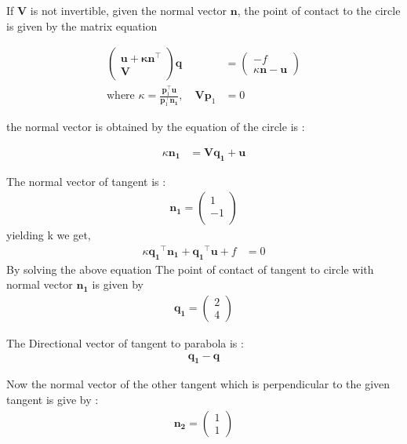 \documentclass[journal,10pt,twocolumn]{article}
\let\vec\mathbf
\newcommand{\myvec}[1]{\ensuremath{\begin{pmatrix}#1\end{pmatrix}}}
\begin{document}
If $\vec{V}$ is not invertible,  given the normal vector $\vec{n}$, the point of contact to the circle is given by the matrix equation

\begin{align}
\label{eq:conic_tangent_q_eigen}
\begin{pmatrix}
\vec{u+\kappa \vec{n}}^{\top} \\ \vec{V}
\end{pmatrix}
\vec{q} &= 
\begin{pmatrix}
-f
\\
\kappa\vec{n}-\vec{u}
\end{pmatrix}
\\
\text{where }  \kappa = \frac{\vec{p}_1^{\top}\vec{u}}{\vec{p}_1^{\top}\vec{n_1}}, \quad \vec{V}\vec{p}_1 &= 0
\label{eq:conic_tangent_qk_eigen}
\end{align}





the normal vector is obtained by the equation of the circle is :

\begin{align}
\kappa \vec{n_1} &= \vec{V} \vec{q_1}+\vec{u}
\end{align}

 The normal vector of tangent is :
\begin{align}
\vec{n_1}=
\begin{pmatrix}
1 \\
-1 \\
\end{pmatrix}
\end{align}
yielding k we get,
\begin{align}
\kappa \vec{q_1}^{\top}\vec{n_1} +\vec{q_1}^{\top}\vec{u}+f&= 0
\end{align}
By solving the above equation 
 The point of contact of tangent to circle with normal vector $\vec{n_1}$ is given by
 \begin{align}
 \vec{q_1}=\myvec{2\\4}
 \end{align}

 The Directional vector of tangent to parabola is :
 \begin{align}
\vec{q_1}-\vec{q}
\end{align}

Now the normal vector of the other tangent which is perpendicular to the given tangent is give by :
\begin{align}
\vec{n_2}=\myvec{1\\1}
\end{align}
\end{document}
